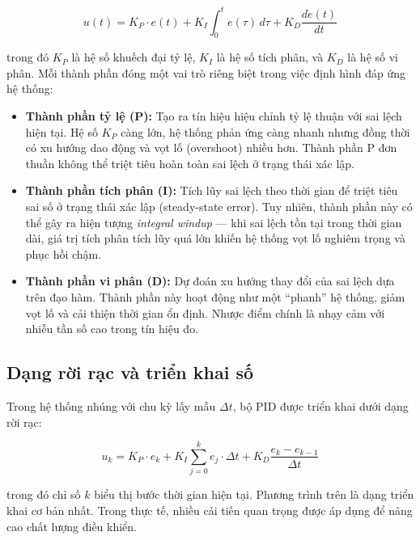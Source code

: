 \begin{equation}
    u(t) = K_P \cdot e(t) + K_I \int_{0}^{t} e(\tau)\,d\tau + K_D \frac{de(t)}{dt}
    \label{eq:pid_continuous}
\end{equation}

trong đó $K_P$ là hệ số khuếch đại tỷ lệ, $K_I$ là hệ số tích phân, và $K_D$ là hệ số vi phân. Mỗi thành phần đóng một vai trò riêng biệt trong việc định hình đáp ứng hệ thống:

\begin{itemize}
    \item \textbf{Thành phần tỷ lệ (P):} Tạo ra tín hiệu hiệu chỉnh tỷ lệ thuận với sai lệch hiện tại. Hệ số $K_P$ càng lớn, hệ thống phản ứng càng nhanh nhưng đồng thời có xu hướng dao động và vọt lố (overshoot) nhiều hơn. Thành phần P đơn thuần không thể triệt tiêu hoàn toàn sai lệch ở trạng thái xác lập.

    \item \textbf{Thành phần tích phân (I):} Tích lũy sai lệch theo thời gian để triệt tiêu sai số ở trạng thái xác lập (steady-state error). Tuy nhiên, thành phần này có thể gây ra hiện tượng \textit{integral windup} --- khi sai lệch tồn tại trong thời gian dài, giá trị tích phân tích lũy quá lớn khiến hệ thống vọt lố nghiêm trọng và phục hồi chậm.

    \item \textbf{Thành phần vi phân (D):} Dự đoán xu hướng thay đổi của sai lệch dựa trên đạo hàm. Thành phần này hoạt động như một ``phanh'' hệ thống, giảm vọt lố và cải thiện thời gian ổn định. Nhược điểm chính là nhạy cảm với nhiễu tần số cao trong tín hiệu đo.
\end{itemize}

\subsection{Dạng rời rạc và triển khai số}

Trong hệ thống nhúng với chu kỳ lấy mẫu $\Delta t$, bộ PID được triển khai dưới dạng rời rạc:

\begin{equation}
    u_k = K_P \cdot e_k + K_I \sum_{j=0}^{k} e_j \cdot \Delta t + K_D \frac{e_k - e_{k-1}}{\Delta t}
    \label{eq:pid_discrete}
\end{equation}

trong đó chỉ số $k$ biểu thị bước thời gian hiện tại. Phương trình trên là dạng triển khai cơ bản nhất. Trong thực tế, nhiều cải tiến quan trọng được áp dụng để nâng cao chất lượng điều khiển.

